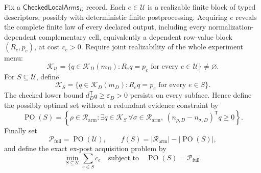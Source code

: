 Fix a \(\mathsf{CheckedLocalArms}_D\) record.  Each \(e\in\mathcal U\) is a realizable finite block of typed descriptors, possibly with deterministic finite postprocessing.  Acquiring \(e\) reveals the complete finite law of every declared output, including every normalization-dependent complementary cell, equivalently a dependent row-value block \((R_e,p_e)\), at cost \(c_e>0\).  Require joint realizability of the whole experiment menu:
\[
\mathcal K_{\mathcal U}
=\{q\in\mathcal K_D(m_D):R_eq=p_e\text{ for every }e\in\mathcal U\}
\ne\varnothing.
\]
For \(S\subseteq\mathcal U\), define
\[
\mathcal K_S
=\{q\in\mathcal K_D(m_D):R_eq=p_e\text{ for every }e\in S\}.
\]
The checked lower bound \(d_D^{\mathsf T}q\geq\varepsilon_D>0\) persists on every subface.  Hence define the possibly optimal set without a redundant evidence constraint by
\[
\operatorname{PO}(S)
=\left\{\rho\in\mathcal R_{\mathrm{arm}}:
\exists q\in\mathcal K_S\ \forall\sigma\in\mathcal R_{\mathrm{arm}},\ 
(n_{\rho,D}-n_{\sigma,D})^{\mathsf T}q\geq0\right\}.
\]
Finally set
\[
\mathcal P_{\mathrm{full}}=\operatorname{PO}(\mathcal U),
\qquad
f(S)=|\mathcal R_{\mathrm{arm}}|-|\operatorname{PO}(S)|,
\]
and define the exact ex-post acquisition problem by
\[
\min_{S\subseteq\mathcal U}\sum_{e\in S}c_e
\quad\text{subject to}\quad
\operatorname{PO}(S)=\mathcal P_{\mathrm{full}}.
\]